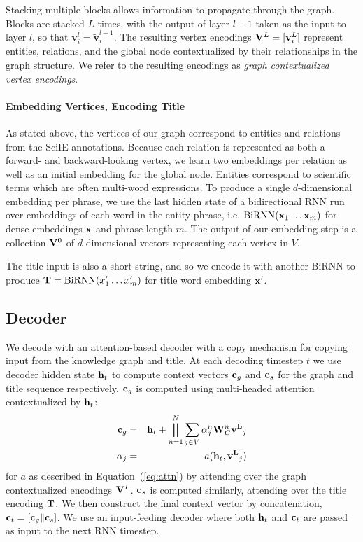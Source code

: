 \documentclass[11pt,a4paper]{article}
\begin{document}
Stacking multiple blocks allows information to propagate through the graph.
Blocks are stacked $L$ times, with the output of layer $l-1$ taken as the input to layer $l$, so that $\mathbf{v}^{l}_i = \mathbf{\tilde{v}}^{l-1}_i$.
The resulting vertex encodings $\mathbf{V}^L = [{\bf v}^L_i]$ represent entities, relations, and the global node contextualized by their relationships in the graph structure. 
We refer to the resulting encodings as {\it graph contextualized vertex encodings}.

\paragraph{Embedding Vertices, Encoding Title}
As stated above, the vertices of our graph correspond to entities and relations from the SciIE annotations.
Because each relation is represented as both a forward- and backward-looking vertex, we learn two embeddings per relation as well as an initial embedding for the global node.
Entities correspond to scientific terms which are often multi-word expressions. 
To produce a single $d$-dimensional embedding per phrase, we use the last hidden state of a bidirectional RNN run over embeddings of each word in the entity phrase, i.e. $\textrm{BiRNN}({\bf x}_1 \ldots {\bf x}_m)$ for dense embeddings ${\bf x}$ and phrase length $m$. 
The output of our embedding step is a collection ${\bf V}^0$ of $d$-dimensional vectors representing each vertex in $V$.


The title input is also a short string, and so we encode it with another BiRNN to produce ${\bf T} = \textrm{BiRNN}(x'_1 \ldots x'_m)$ for title word embedding ${\bf x'}$.

\subsection{Decoder}\label{sec:decode}
We decode with an attention-based decoder with a copy mechanism for copying input from the knowledge graph and title. 
At each decoding timestep $t$ we use decoder hidden state ${\bf h}_t$ to compute context vectors ${\bf c}_g$ and ${\bf c}_s$ for the graph and title sequence respectively.
${\bf c}_g$ is computed using multi-headed attention contextualized by ${\bf h}_t$:
\begin{eqnarray}\label{eq:attn2}
    \mathbf{c}_g &=& \mathbf{h}_t + \bigparallel_{n=1}^N \sum_{j \in V}\alpha^n_{j} \mathbf{W}^n_{G} \mathbf{v^L}_j \\
    \alpha_{j} &=& a(\mathbf{h}_t,\mathbf{v^L}_j)
\end{eqnarray}
for $a$ as described in Equation~(\ref{eq:attn}) by attending over the graph contextualized encodings  ${\bf V}^L$.
${\bf c}_s$ is computed similarly, attending over the title encoding ${\bf T}$.  
We then construct the final context vector by concatenation, ${\bf c}_t = [{\bf c}_g\|{\bf c}_s]$.
We use an input-feeding decoder \cite{Luong2015EffectiveAT} where both ${\bf h}_t$ and ${\bf c}_t$ are passed as input to the next RNN timestep. 
\end{document}
